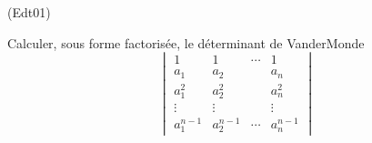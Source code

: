 \begin{tiny}(Edt01)\end{tiny}
Calculer, sous forme factoris{\'e}e, le d{\'e}terminant de
VanderMonde
\[
\begin{vmatrix}
1 & 1 & \cdots  & 1 \\
a_{1} & a_{2} &  & a_{n} \\
a_{1}^{2} & a_{2}^{2} &  & a_{n}^{2} \\
\vdots  & \vdots  &  & \vdots  \\
a_{1}^{n-1} & a_{2}^{n-1} & \cdots  & a_{n}^{n-1}
\end{vmatrix}
\]